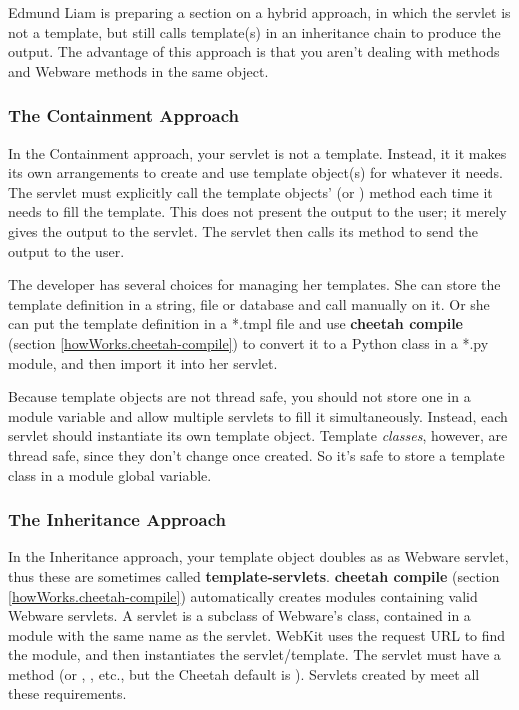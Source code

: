 Edmund Liam is preparing a section on a hybrid approach, in which the 
servlet is not a template, but still calls template(s) in an inheritance
chain to produce the output.  The advantage of this approach is that you
aren't dealing with  methods and Webware methods in the
same object.

\subsubsection{The Containment Approach}
\label{webware.containment}

In the Containment approach, your servlet is not a template.  Instead, it 
it makes its own arrangements to create and use template object(s) for whatever
it needs.  The servlet must explicitly call the template objects'
 (or ) method each time it needs to fill
the template.  This does not present the output to the user; it merely gives
the output to the servlet.  The servlet then calls its
 method to send the output to the user.

The developer has several choices for managing her templates.  She can store the
template definition in a string, file or database and call
 manually on it.  Or she can put the
template definition in a *.tmpl file and use {\bf cheetah compile} (section
\ref{howWorks.cheetah-compile}) to convert it to a Python class in a *.py
module, and then import it into her servlet.

Because template objects are not thread safe, you should not store one
in a module variable and allow multiple servlets to fill it simultaneously.
Instead, each servlet should instantiate its own template object.  Template
{\em classes}, however, are thread safe, since they don't change once created.
So it's safe to store a template class in a module global variable.



\subsubsection{The Inheritance Approach}
\label{webware.inheritance}

In the Inheritance approach, your template object doubles as as Webware 
servlet, thus these are sometimes called {\bf template-servlets}.  {\bf cheetah
compile} (section \ref{howWorks.cheetah-compile}) automatically creates modules
containing valid Webware servlets.  A servlet is a subclass of Webware's
 class, contained in a module with the same name as
the servlet.  WebKit uses the request URL to find the module, and then
instantiates the servlet/template.  The servlet must have a 
method (or , , etc., but the
Cheetah default is ).  Servlets created by  meet all these requirements.

